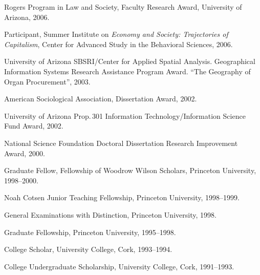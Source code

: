 \documentclass[11pt,article,oneside]{memoir}
\begin{document}
\ind Rogers Program in Law and Society, Faculty Research Award, University of Arizona, 2006.

\ind Participant, Summer Institute on \emph{Economy and Society: Trajectories of Capitalism}, Center for Advanced Study in the Behavioral Sciences, 2006.

\ind University of Arizona SBSRI/Center for Applied Spatial
Analysis. Geographical Information Systems Research Assistance
Program Award. ``The Geography of Organ Procurement'', 2003.

\ind American Sociological Association, Dissertation Award, 2002.

\ind University of Arizona Prop.\,301 Information Technology/Information Science Fund Award, 2002.

\ind National Science Foundation Doctoral Dissertation Research Improvement Award, 2000.

\ind Graduate Fellow, Fellowship of Woodrow Wilson Scholars, Princeton University,  1998--2000. 

\ind Noah Cotsen Junior Teaching Fellowship, Princeton University, 1998--1999.

\ind General Examinations with Distinction, Princeton University, 1998.

\ind Graduate Fellowship, Princeton University, 1995--1998.

\ind College Scholar, University College, Cork, 1993--1994.

\ind College Undergraduate Scholarship, University
College, Cork, 1991--1993.

\bigskip 


\medskip

\medskip


\medskip

\medskip
\end{document}
